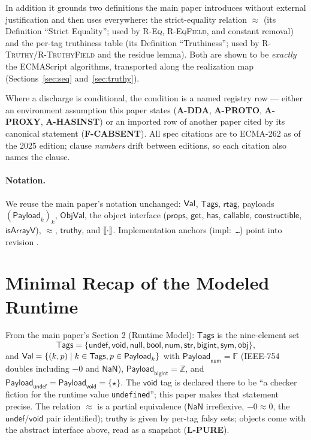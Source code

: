 \documentclass[11pt]{article}
\newcommand{\ObjVal}{\mathsf{ObjVal}}
\newcommand{\Tags}{\mathsf{Tags}}
\newcommand{\Payload}{\mathsf{Payload}}
\newcommand{\rtag}{\mathsf{rtag}}
\begin{document}
In addition it grounds two definitions the main paper introduces without
external justification and then uses everywhere: the strict-equality
relation $\approx$ (its Definition ``Strict Equality''; used by \textsc{R-Eq},
\textsc{R-EqField}, and constant removal) and
the per-tag truthiness table (its Definition ``Truthiness''; used by
\textsc{R-Truthy}/\textsc{R-TruthyField} and the residue lemma). Both are
shown to be \emph{exactly} the ECMAScript algorithms, transported along
the realization map (Sections~\ref{sec:seq} and~\ref{sec:truthy}).

Where a discharge is conditional, the condition is a named registry row
— either an environment assumption this paper states
(\textbf{A-DDA}, \textbf{A-PROTO}, \textbf{A-PROXY},
\textbf{A-HASINST}) or an imported row of another paper cited by its
canonical statement (\textbf{F-CABSENT}). All spec citations are to
ECMA-262 as of the 2025 edition; clause \emph{numbers} drift between
editions, so each citation also names the clause.

\paragraph{Notation.}
We reuse the main paper's notation unchanged: $\mathsf{Val}$, $\Tags$, $\rtag$,
payloads $(\Payload_k)_k$, $\ObjVal$, the object interface
($\mathsf{props}$, $\mathsf{get}$, $\mathsf{has}$, $\mathsf{callable}$,
$\mathsf{constructible}$, $\mathsf{isArrayV}$), $\approx$,
$\mathsf{truthy}$, and $\llbracket \cdot \rrbracket$. Implementation anchors
(\textsf{impl:}~\texttt{\dots}) point into revision \texttt{\skjspinhash}.

\section{Minimal Recap of the Modeled Runtime}
\label{sec:recap}

From the main paper's Section 2 (Runtime Model): $\Tags$ is the
nine-element set
\[
\Tags = \{\mathsf{undef}, \mathsf{void}, \mathsf{null}, \mathsf{bool},
\mathsf{num}, \mathsf{str}, \mathsf{bigint}, \mathsf{sym},
\mathsf{obj}\},
\]
and $\Val = \{(k,p) \mid k \in \Tags, p \in \Payload_k\}$ with
$\Payload_{\mathsf{num}} = \mathbb{F}$ (IEEE-754 doubles including $-0$
and $\mathsf{NaN}$), $\Payload_{\mathsf{bigint}} = \mathbb{Z}$, and
$\Payload_{\mathsf{undef}} = \Payload_{\mathsf{void}} = \{\star\}$. The
$\mathsf{void}$ tag is declared there to be ``a checker fiction for the
runtime value \texttt{undefined}''; this paper makes that statement
precise. The relation $\approx$ is a partial equivalence
($\mathsf{NaN}$ irreflexive, $-0 \approx 0$, the
$\mathsf{undef}/\mathsf{void}$ pair identified);
$\mathsf{truthy}$ is given by per-tag falsy sets; objects come with the
abstract interface above, read as a snapshot (\textbf{L-PURE}).
\end{document}
